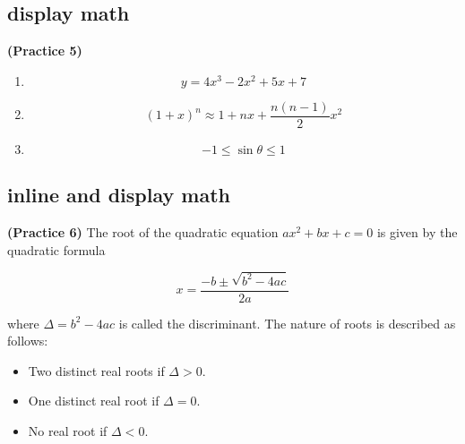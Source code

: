 \documentclass[12pt]{article}
\begin{document}
\subsection{display math}

\textbf{(Practice 5)}

\begin{enumerate}
    \item 
    \[
    y = 4x^3 - 2x^2 + 5x + 7
    \]

    \item 
    \[
    (1 + x)^n \approx 1 + nx + \frac{n(n - 1)}{2}x^2
    \]

    \item 
    \[
    -1 \le \sin \theta \le 1
    \]
\end{enumerate}

\subsection{inline and display math}

\textbf{(Practice 6)} The root of the quadratic equation 
$ax^2 + bx + c = 0$ is given by the quadratic formula

\[
x = \frac{-b \pm \sqrt{b^2 - 4ac}}{2a}
\]

where $\Delta = b^2 - 4ac$ is called the discriminant. The nature of roots is described
as follows:

\begin{itemize}
    \item Two distinct real roots if $\Delta > 0$.
    \item One distinct real root if $\Delta = 0$.
    \item No real root if $\Delta < 0$.
\end{itemize}
\end{document}
